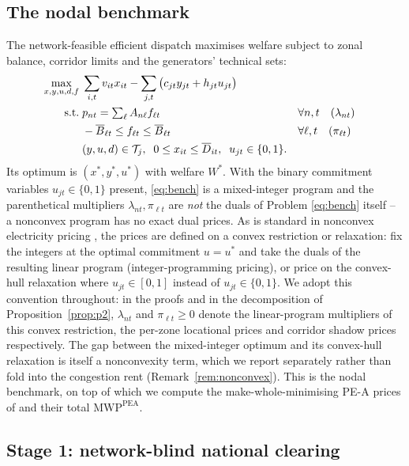 \documentclass[review,3p,times]{elsarticle}
\theoremstyle{plain}
\theoremstyle{definition}
\begin{document}
\subsection{The nodal benchmark}
\label{sec:bench}

The network-feasible efficient dispatch maximises welfare subject to zonal
balance, corridor limits and the generators' technical sets:
\begin{align}
\max_{x,y,u,d,f}\;& \sum_{i,t} v_{it}x_{it}-\sum_{j,t}\big(c_{jt}y_{jt}+h_{jt}u_{jt}\big)
\label{eq:bench}\\
\text{s.t.}\;& p_{nt}=\textstyle\sum_{\ell} A_{n\ell}f_{\ell t}
   && \forall n,t\quad(\lambda_{nt}) \notag\\
& -\overline B_{\ell t}\le f_{\ell t}\le \overline B_{\ell t}
   && \forall \ell,t\quad(\pi_{\ell t}) \notag\\
& (y,u,d)\in\mathcal T_j,\;\; 0\le x_{it}\le\overline D_{it},\;\; u_{jt}\in\{0,1\}.
   && \notag
\end{align}
Its optimum is $(x^\ast,y^\ast,u^\ast)$ with welfare $W^\ast$. With the binary
commitment variables $u_{jt}\in\{0,1\}$ present, \eqref{eq:bench} is a
mixed-integer program and the parenthetical multipliers $\lambda_{nt},\pi_{\ell
t}$ are \emph{not} the duals of Problem \eqref{eq:bench} itself -- a nonconvex program has
no exact dual prices. As is standard in nonconvex electricity pricing
\citep{oneill2005, gribik2007, liberopoulos2016}, the prices are defined on a
convex restriction or relaxation: fix the integers at the optimal commitment
$u=u^\ast$ and take the duals of the resulting linear program (integer-programming
pricing), or price on the convex-hull relaxation where  $u_{jt}\in [0,1]$ instead of $u_{jt}\in\{0,1\}$. We adopt this convention throughout: in
the proofs and in the decomposition of Proposition~\ref{prop:p2}, $\lambda_{nt}$
and $\pi_{\ell t}\ge0$ denote the linear-program multipliers of this convex
restriction, the per-zone locational prices and corridor shadow prices
respectively. The gap between the mixed-integer optimum and its convex-hull
relaxation is itself a nonconvexity term, which we report separately rather than
fold into the congestion rent (Remark~\ref{rem:nonconvex}). This is the nodal benchmark, on
top of which we compute the make-whole-minimising PE-A prices of
\citet{bichler2022} and their total $\mathrm{MWP}^{\mathrm{PEA}}$.

\subsection{Stage 1: network-blind national clearing}
\label{sec:stage1}
\end{document}
